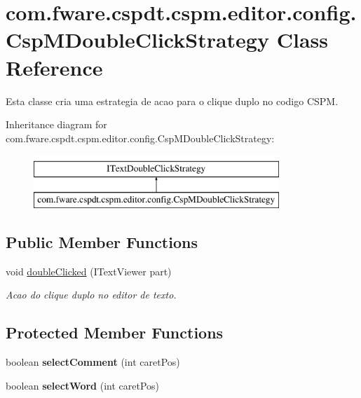 \hypertarget{classcom_1_1fware_1_1cspdt_1_1cspm_1_1editor_1_1config_1_1_csp_m_double_click_strategy}{}\section{com.\+fware.\+cspdt.\+cspm.\+editor.\+config.\+Csp\+M\+Double\+Click\+Strategy Class Reference}
\label{classcom_1_1fware_1_1cspdt_1_1cspm_1_1editor_1_1config_1_1_csp_m_double_click_strategy}


Esta classe cria uma estrategia de acao para o clique duplo no codigo C\+S\+PM.  


Inheritance diagram for com.\+fware.\+cspdt.\+cspm.\+editor.\+config.\+Csp\+M\+Double\+Click\+Strategy\+:\begin{figure}[H]
\begin{center}
\leavevmode
\includegraphics[height=2.000000cm]{classcom_1_1fware_1_1cspdt_1_1cspm_1_1editor_1_1config_1_1_csp_m_double_click_strategy}
\end{center}
\end{figure}
\subsection*{Public Member Functions}
\begin{DoxyCompactItemize}
\item 
void \hyperlink{classcom_1_1fware_1_1cspdt_1_1cspm_1_1editor_1_1config_1_1_csp_m_double_click_strategy_a0e4b88b8359d976abf366b46705eb55c}{double\+Clicked} (I\+Text\+Viewer part)
\begin{DoxyCompactList}\small\item\em Acao do clique duplo no editor de texto. \end{DoxyCompactList}\end{DoxyCompactItemize}
\subsection*{Protected Member Functions}
\begin{DoxyCompactItemize}
\item 
\mbox{\label{classcom_1_1fware_1_1cspdt_1_1cspm_1_1editor_1_1config_1_1_csp_m_double_click_strategy_af4c4d72a869a3940954dc9e88582cd81}} 
boolean {\bfseries select\+Comment} (int caret\+Pos)
\item 
\mbox{\label{classcom_1_1fware_1_1cspdt_1_1cspm_1_1editor_1_1config_1_1_csp_m_double_click_strategy_ac9cb7bcc033279d70e452189958cf83a}} 
boolean {\bfseries select\+Word} (int caret\+Pos)
\end{DoxyCompactItemize}
